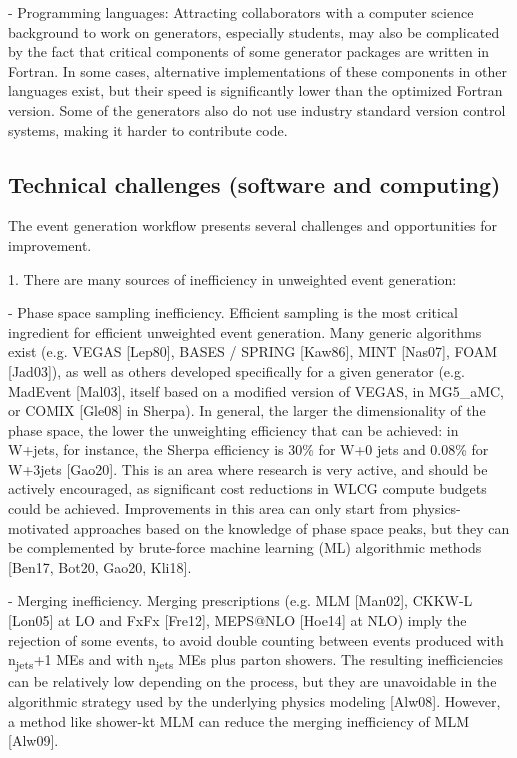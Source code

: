 \documentclass[10pt,a4paper]{article}
\begin{document}
- {Programming languages}: Attracting collaborators with a computer
science background to work on generators, especially students, may also
be complicated by the fact that critical components of some generator
packages are written in Fortran. In some cases, alternative
implementations of these components in other languages exist, but their
speed is significantly lower than the optimized Fortran version. Some of
the generators also do not use industry standard version control
systems, making it harder to contribute code.

\hypertarget{technical-challenges-software-and-computing}{%
\subsection{Technical challenges (software and
computing)}\label{technical-challenges-software-and-computing}}

The event generation workflow presents several challenges and
opportunities for improvement.

1. There are many sources of inefficiency in unweighted event
generation:

- {Phase space sampling inefficiency}. Efficient sampling is the most
critical ingredient for efficient unweighted event generation. Many
generic algorithms exist (e.g. VEGAS {[}Lep80{]}, BASES / SPRING
{[}Kaw86{]}, MINT {[}Nas07{]}, FOAM {[}Jad03{]}), as well as others
developed specifically for a given generator (e.g. MadEvent {[}Mal03{]},
itself based on a modified version of VEGAS, in MG5\_aMC, or COMIX
{[}Gle08{]} in Sherpa). In general, the larger the dimensionality of the
phase space, the lower the unweighting efficiency that can be achieved:
in W+jets, for instance, the Sherpa efficiency is 30\% for W+0 jets and
0.08\% for W+3jets {[}Gao20{]}. This is an area where research is very
active, and should be actively encouraged, as significant cost
reductions in WLCG compute budgets could be achieved. Improvements in
this area can only start from physics-motivated approaches based on the
knowledge of phase space peaks, but they can be complemented by
brute-force machine learning (ML) algorithmic methods {[}Ben17, Bot20,
Gao20, Kli18{]}.

- {Merging inefficiency}. Merging prescriptions (e.g. MLM {[}Man02{]},
CKKW-L {[}Lon05{]} at LO and FxFx {[}Fre12{]}, MEPS@NLO {[}Hoe14{]} at
NLO) imply the rejection of some events, to avoid double counting
between events produced with n\textsubscript{jets}+1 MEs and with
n\textsubscript{jets} MEs plus parton showers. The resulting
inefficiencies can be relatively low depending on the process, but they
are unavoidable in the algorithmic strategy used by the underlying
physics modeling {[}Alw08{]}. However, a method like shower-kt MLM can
reduce the merging inefficiency of MLM {[}Alw09{]}.
\end{document}
